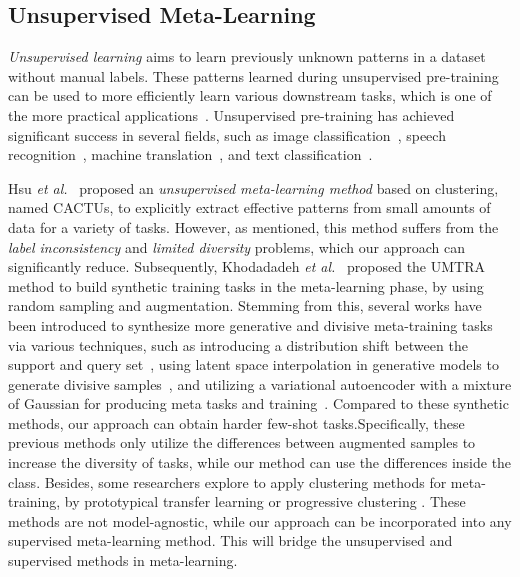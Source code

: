 \documentclass[runningheads]{llncs}
\begin{document}
\subsection{Unsupervised Meta-Learning}
{\it Unsupervised learning} aims to learn previously unknown patterns in a dataset without manual labels. These patterns learned during unsupervised pre-training can be used to more efficiently learn various downstream tasks, which is one of the more practical applications~\cite{hinton2006fast,bengio2007greedy,ranzato2007efficient,vincent2008extracting,erhan2010does}. Unsupervised pre-training has achieved significant success in several fields, such as image classification~\cite{zhang2017split,he2019momentum}, speech recognition~\cite{yu2010roles}, machine translation~\cite{ramachandran2016unsupervised}, and text classification~\cite{dai2015semi,howard2018universal,radford2018improving}.

Hsu {\it et al.}~\cite{hsu2018unsupervised} proposed an {\it unsupervised meta-learning method} based on clustering, named CACTUs, to explicitly extract effective patterns from small amounts of data for a variety of tasks. However, as mentioned, this method suffers from the \textit{label inconsistency} and \textit{limited diversity} problems, which our approach can significantly reduce. Subsequently, Khodadadeh {\it et al.}~\cite{khodadadeh2019unsupervised} proposed the UMTRA method to build synthetic training tasks in the meta-learning phase, by using random sampling and augmentation. 
Stemming from this, several works have been introduced to synthesize more generative and divisive meta-training tasks via various techniques, such as introducing a distribution shift between the support and query set~\cite{qin2020unsupervised}, using latent space interpolation in generative models to generate divisive samples~\cite{khodadadeh2020unsupervised}, and utilizing a variational autoencoder with a mixture of Gaussian for producing meta tasks and training~\cite{lee2020meta-gmvae}. Compared to these synthetic methods, our approach can obtain harder few-shot tasks.Specifically, these previous methods only utilize the differences between augmented samples to increase the diversity of tasks, while our method can use the differences inside the class. 
{Besides, some researchers explore to apply clustering methods for meta-training, by prototypical transfer learning \cite{medina2020self} or progressive clustering \cite{ji2020unsupervised}. These methods are not model-agnostic, while our approach can be incorporated into any supervised meta-learning method. This will bridge the unsupervised and supervised methods in meta-learning. 
}
\end{document}

